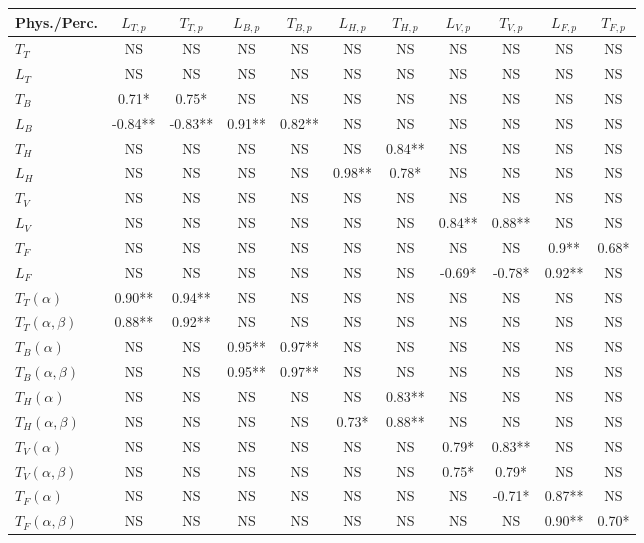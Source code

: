 \documentclass[a0,portrait]{a0poster}
\begin{document}
\begin{multicols}{2}
\begin{center}\vspace{1cm}
\label{table:pearsonc}
\begin{tabular}{ l | c c c c c c c c c c }
\hline
	Phys./Perc. & $L_{T,p}$ & $T_{T,p}$ & $L_{B,p}$ & $T_{B,p}$ & $L_{H,p}$ & $T_{H,p}$ & $L_{V,p}$ & $T_{V,p}$ & $L_{F,p}$ & $T_{F,p}$ \\ \hline
	$T_T$ & NS & NS & NS & NS & NS & NS & NS & NS & NS & NS \\
	$L_T$ & NS & NS & NS & NS & NS & NS & NS & NS & NS & NS \\ \hline
	$T_B$ & 0.71* & 0.75* & NS & NS & NS & NS & NS & NS & NS & NS \\
	$L_B$ & -0.84** & -0.83** & 0.91** & 0.82** & NS & NS & NS & NS & NS & NS \\ \hline
	$T_H$ & NS & NS & NS & NS & NS & 0.84** & NS & NS & NS & NS \\
	$L_H$ & NS & NS & NS & NS & 0.98** & 0.78* & NS & NS & NS & NS \\ \hline
	$T_V$ & NS & NS & NS & NS & NS & NS & NS & NS & NS & NS \\
	$L_V$ & NS & NS & NS & NS & NS & NS & 0.84** & 0.88** & NS & NS \\ \hline
	$T_F$ & NS & NS & NS & NS & NS & NS & NS & NS & 0.9** & 0.68* \\
	$L_F$ & NS & NS & NS & NS & NS & NS & -0.69* & -0.78* & 0.92** & NS \\ \hline
	$T_T(\alpha)$ & 0.90** & 0.94** & NS & NS & NS & NS & NS & NS & NS & NS \\
	$T_T(\alpha, \beta)$ & 0.88** & 0.92** & NS & NS & NS & NS & NS & NS & NS & NS \\ \hline
	$T_B(\alpha)$ & NS & NS & 0.95** & 0.97** & NS & NS & NS & NS & NS & NS \\
	$T_B(\alpha, \beta)$ & NS & NS & 0.95** & 0.97** & NS & NS & NS & NS & NS & NS \\ \hline
	$T_H(\alpha)$ & NS & NS & NS & NS & NS & 0.83** & NS & NS & NS & NS \\
	$T_H(\alpha, \beta)$ & NS & NS & NS & NS & 0.73* & 0.88** & NS & NS & NS & NS \\ \hline
	$T_V(\alpha)$ & NS & NS & NS & NS & NS & NS & 0.79* & 0.83** & NS & NS \\
	$T_V(\alpha, \beta)$ & NS & NS & NS & NS & NS & NS & 0.75* & 0.79* & NS & NS \\ \hline
	$T_F(\alpha)$ & NS & NS & NS & NS & NS & NS & NS & -0.71* & 0.87** & NS \\
	$T_F(\alpha, \beta)$ & NS & NS & NS & NS & NS & NS & NS & NS & 0.90** & 0.70* \\ \hline
\end{tabular}
\end{center}\vspace{1cm}




\end{multicols}
\end{document}
